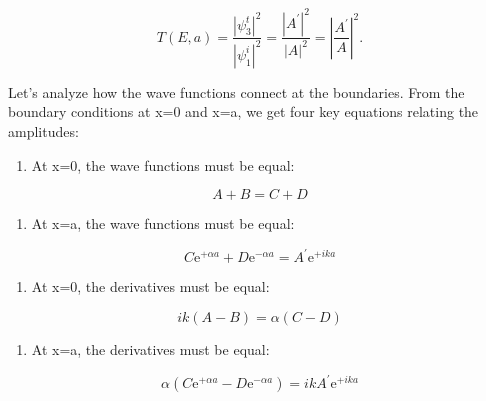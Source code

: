 \documentclass[
  a4paper,
]{book}
\providecommand{\tightlist}{%
  \setlength{\itemsep}{0pt}\setlength{\parskip}{0pt}}
\begin{document}
\[
T \left(E, a\right) = \frac{\left| \psi_{3}^{t} \right|^2}{\left| \psi_{1}^{i} \right|^2} = \frac{\left| A^{\prime} \right|^2}{\left| A \right|^2} = \left| \frac{A^{\prime}}{A} \right|^2  \mathrm{.}
\]

Let's analyze how the wave functions connect at the boundaries. From the
boundary conditions at x=0 and x=a, we get four key equations relating
the amplitudes:

\begin{enumerate}
\def\labelenumi{\arabic{enumi}.}
\tightlist
\item
  At x=0, the wave functions must be equal:
\end{enumerate}

\[A + B = C + D\]

\begin{enumerate}
\def\labelenumi{\arabic{enumi}.}
\setcounter{enumi}{1}
\tightlist
\item
  At x=a, the wave functions must be equal:
\end{enumerate}

\[C \mathrm{e}^{+ \alpha a} + D \mathrm{e}^{- \alpha a} = A^{\prime} \mathrm{e}^{+ i k a}\]

\begin{enumerate}
\def\labelenumi{\arabic{enumi}.}
\setcounter{enumi}{2}
\tightlist
\item
  At x=0, the derivatives must be equal:
\end{enumerate}

\[i k \left( A - B \right) = \alpha \left( C - D \right)\]

\begin{enumerate}
\def\labelenumi{\arabic{enumi}.}
\setcounter{enumi}{3}
\tightlist
\item
  At x=a, the derivatives must be equal:
\end{enumerate}

\[\alpha \left( C \mathrm{e}^{+ \alpha a} - D \mathrm{e}^{- \alpha a} \right) = i k A^{\prime} \mathrm{e}^{+ i k a}\]
\end{document}
